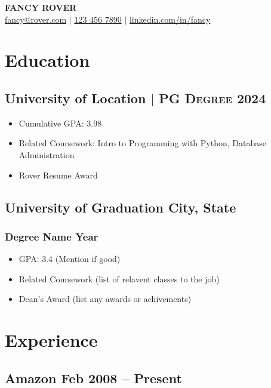 \documentclass{article}
\begin{document}
\begin{center}
    {\Huge\bfseries FANCY ROVER} \\ \medskip
    {\color{icnclr}\faEnvelope[regular]} \href{mailto:hi@example.com}{fancy@rover.com} $|$ 
    {\color{icnclr}} \href{tel:1234567890}{123 456 7890} $|$
    {\color{icnclr}\faLinkedinIn} \href{https://www.linkedin.com/in/}{linkedin.com/in/fancy}
\end{center}

\section{Education}
\subsection{University of Location $|$ {\normalfont\textsc{PG Degree}} \hfill 2024}
\begin{itemize}
    \item Cumulative GPA: 3.98
    \item Related Coursework: Intro to Programming with Python, Database Administration
    \item Rover Resume Award
\end{itemize}

\subsection{University of Graduation \hfill City, State}
\subsubsection{Degree Name \hfill Year}
\begin{itemize}
    \item GPA: 3.4 (Mention if good)
    \item Related Coursework (list of relavent classes to the job)
    \item Dean's Award (list any awards or achivements)
\end{itemize}

\section{Experience}
\subsection{Amazon \hfill Feb 2008 -- Present}
\end{document}
